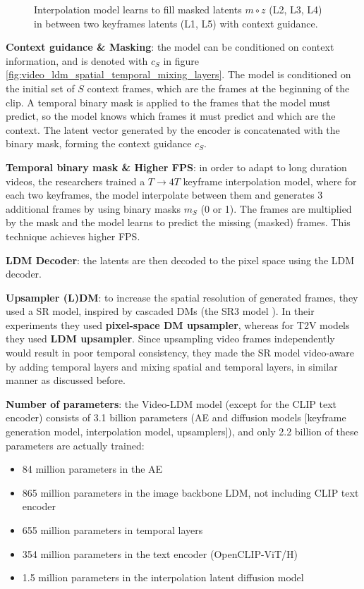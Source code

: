 \begin{figure}
    \centering
    \scalebox{0.4}{
        
    }
    \caption{Interpolation model learns to fill masked latents $m \circ z$ (L2, L3, L4) in between two keyframes latents (L1, L5) with context guidance.}
\end{figure}

\textbf{Context guidance \& Masking}: the model can be conditioned on context information, and is denoted with $c_S$ in figure \ref{fig:video_ldm_spatial_temporal_mixing_layers}. The model is conditioned on the initial set of $S$ context frames, which are the frames at the beginning of the clip. A temporal binary mask is applied to the frames that the model must predict, so the model knows which frames it must predict and which are the context. The latent vector generated by the encoder is concatenated with the binary mask, forming the context guidance $c_S$.

\textbf{Temporal binary mask \& Higher FPS}: in order to adapt to long duration videos, the researchers trained a $T \rightarrow 4T$ keyframe interpolation model, where for each two keyframes, the model interpolate between them and generates 3 additional frames by using binary masks $m_S$ (0 or 1). The frames are multiplied by the mask and the model learns to predict the missing (masked) frames. This technique achieves higher FPS.

\textbf{LDM Decoder}: the latents are then decoded to the pixel space using the LDM decoder.

\textbf{Upsampler (L)DM}: to increase the spatial resolution of generated frames, they used a SR model, inspired by cascaded DMs \cite{cascaded_diffusion_models} (the SR3 model \cite{sr3}). In their experiments they used \textbf{pixel-space DM upsampler}, whereas for T2V models they used \textbf{LDM upsampler}. Since upsampling video frames independently would result in poor temporal consistency, they made the SR model video-aware by adding temporal layers and mixing spatial and temporal layers, in similar manner as discussed before.

\textbf{Number of parameters}: the Video-LDM model (except for the CLIP text encoder) consists of 3.1 billion parameters (AE and diffusion models [keyframe generation model, interpolation model, upsamplers]), and only 2.2 billion of these parameters are actually trained:

\begin{itemize}
    \item 84 million parameters in the AE
    \item 865 million parameters in the image backbone LDM, not including CLIP text encoder
    \item 655 million parameters in temporal layers
    \item 354 million parameters in the text encoder (OpenCLIP-ViT/H)
    \item 1.5 million parameters in the interpolation latent diffusion model
\end{itemize}

